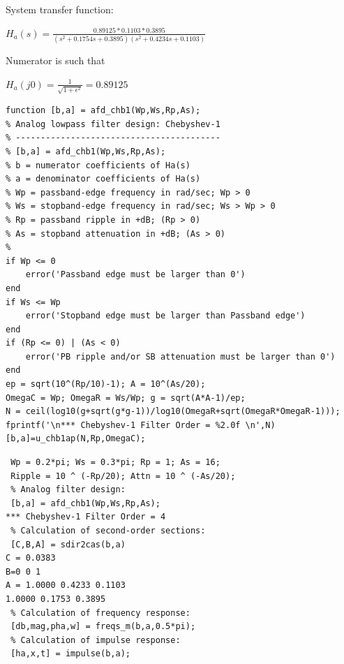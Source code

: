 \documentclass{article}
\begin{document}
System transfer function:
\begin{center}
$H_a(s)=\frac{0.89125*0.1103*0.3895}{(s^2+0.1754s+0.3895)(s^2+0.4234s+0.1103)}$
\end{center}
Numerator is such that
\begin{center}
$H_a(j0)= \frac{1}{\sqrt{1+\epsilon^2}}=0.89125$
\end{center}
\newpage
\begin{lstlisting}
function [b,a] = afd_chb1(Wp,Ws,Rp,As);
% Analog lowpass filter design: Chebyshev-1
% -----------------------------------------
% [b,a] = afd_chb1(Wp,Ws,Rp,As);
% b = numerator coefficients of Ha(s)
% a = denominator coefficients of Ha(s)
% Wp = passband-edge frequency in rad/sec; Wp > 0
% Ws = stopband-edge frequency in rad/sec; Ws > Wp > 0
% Rp = passband ripple in +dB; (Rp > 0)
% As = stopband attenuation in +dB; (As > 0)
%
if Wp <= 0
    error('Passband edge must be larger than 0')
end
if Ws <= Wp
    error('Stopband edge must be larger than Passband edge')
end
if (Rp <= 0) | (As < 0)
    error('PB ripple and/or SB attenuation must be larger than 0')
end
ep = sqrt(10^(Rp/10)-1); A = 10^(As/20);
OmegaC = Wp; OmegaR = Ws/Wp; g = sqrt(A*A-1)/ep;
N = ceil(log10(g+sqrt(g*g-1))/log10(OmegaR+sqrt(OmegaR*OmegaR-1)));
fprintf('\n*** Chebyshev-1 Filter Order = %2.0f \n',N)
[b,a]=u_chb1ap(N,Rp,OmegaC);
\end{lstlisting}
\begin{lstlisting}
 Wp = 0.2*pi; Ws = 0.3*pi; Rp = 1; As = 16;
 Ripple = 10 ^ (-Rp/20); Attn = 10 ^ (-As/20);
 % Analog filter design:
 [b,a] = afd_chb1(Wp,Ws,Rp,As);
*** Chebyshev-1 Filter Order = 4
 % Calculation of second-order sections:
 [C,B,A] = sdir2cas(b,a)
C = 0.0383
B=0 0 1
A = 1.0000 0.4233 0.1103
1.0000 0.1753 0.3895
 % Calculation of frequency response:
 [db,mag,pha,w] = freqs_m(b,a,0.5*pi);
 % Calculation of impulse response:
 [ha,x,t] = impulse(b,a);
    
\end{lstlisting}
\end{document}
